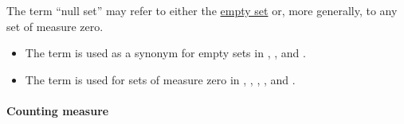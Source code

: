\begin{concept}\label{con:measure_zero_set}
\end{concept}

\begin{remark}\label{rem:measure_zero_and_null_set}
  The term \enquote{null set} may refer to either the \hyperref[def:empty_set]{empty set} or, more generally, to any set of measure zero.

  \begin{itemize}
    \item The term is used as a synonym for empty sets in
    \cite[xix]{Mendelson2015Logic},
    \cite[123]{Rosen2019DiscreteMathematics},
    \cite[\S 1.19]{Schechter1997AnalysisHandbook} and
    \cite[152]{Kuyk1977ComplementarityInMathematics}.

    \item The term is used for sets of measure zero in
    \cite[128]{Jech2006SetTheory},
    \cite[2]{Kunen2013SetTheory},
    \cite[26]{Folland1999RealAnalysis},
    \cite[34]{Feller1971ProbabilityTheoryVol2},
    \cite[732]{HasselblattKatok1995DynamicalSystems} and
    \cite[8]{Clarke2013OptimalControl}.
  \end{itemize}
\end{remark}

\paragraph{Counting measure}

